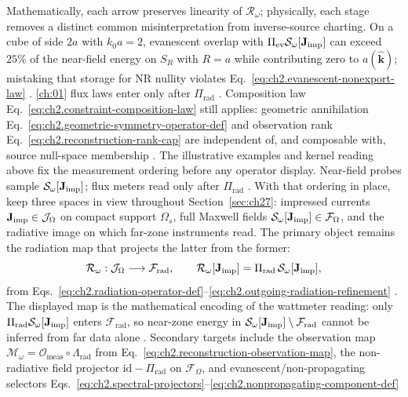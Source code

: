Mathematically, each arrow preserves linearity of \(\mathcal{R}_\omega\);
physically, each stage removes a distinct common misinterpretation from inverse-source
charting. On a cube of side \(2a\) with \(k_0 a=2\), evanescent overlap with
\(\Pi_{\mathrm{ev}}\mathcal{S}_\omega[\mathbf{J}_{\mathrm{imp}}]\) can exceed \(25\%\) of the
near-field energy on \(S_R\) with \(R=a\) while contributing zero to
\(a(\widehat{\mathbf{k}})\); mistaking that storage for NR nullity violates
Eq.~\eqref{eq:ch2.evanescent-nonexport-law} \cite{stratton1941}.
\ref{ch:01} flux laws enter only after \(\Pi_{\mathrm{rad}}\)
\cite{harrington2001}.
Composition law Eq.~\eqref{eq:ch2.constraint-composition-law} still
applies: geometric annihilation Eq.~\eqref{eq:ch2.geometric-symmetry-operator-def} and
observation rank Eq.~\eqref{eq:ch2.reconstruction-rank-cap} are independent of, and
composable with, source null-space membership \cite{harrington2001}.
The illustrative examples and kernel reading above fix the measurement ordering before any
operator display. Near-field probes sample \(\mathcal{S}_\omega[\mathbf{J}_{\mathrm{imp}}]\); flux meters read only
after \(\Pi_{\mathrm{rad}}\) \cite{stratton1941}. With that ordering in place,
keep three spaces in view throughout Section~\ref{sec:ch27}: impressed currents
\(\mathbf{J}_{\mathrm{imp}}\in\mathcal{J}_\Omega\) on compact support \(\Omega_s\), full Maxwell fields
\(\mathcal{S}_\omega[\mathbf{J}_{\mathrm{imp}}]\in\mathcal{F}_\Omega\), and the radiative image on which far-zone
instruments read. The primary object remains the radiation map that projects the latter from the
former:
\begin{equation}
\label{eq:ch2.nullspace-operator-targets}
\mathcal{R}_\omega:\mathcal{J}_\Omega\longrightarrow\mathcal{F}_{\mathrm{rad}},
\qquad
\mathcal{R}_\omega[\mathbf{J}_{\mathrm{imp}}]=\Pi_{\mathrm{rad}}\,\mathcal{S}_\omega[\mathbf{J}_{\mathrm{imp}}],
\end{equation}
from Eqs.~\eqref{eq:ch2.radiation-operator-def}--\eqref{eq:ch2.outgoing-radiation-refinement}
\cite{stratton1941}. The displayed map is the mathematical encoding of the wattmeter reading:
only \(\Pi_{\mathrm{rad}}\mathcal{S}_\omega[\mathbf{J}_{\mathrm{imp}}]\) enters \(\mathcal{F}_{\mathrm{rad}}\), so
near-zone energy in \(\mathcal{S}_\omega[\mathbf{J}_{\mathrm{imp}}]\setminus\mathcal{F}_{\mathrm{rad}}\) cannot be
inferred from far data alone \cite{stratton1941}. Secondary targets include the observation map
\(\mathcal{M}_\omega=\mathcal{O}_{\mathrm{meas}}\circ\Lambda_{\mathrm{rad}}\) from
Eq.~\eqref{eq:ch2.reconstruction-observation-map}, the non-radiative field projector
\(\mathrm{id}-\Pi_{\mathrm{rad}}\) on \(\mathcal{F}_\Omega\), and evanescent/non-propagating
selectors Eqs.~\eqref{eq:ch2.spectral-projectors}--\eqref{eq:ch2.nonpropagating-component-def}
